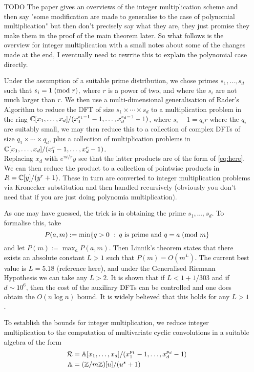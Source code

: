 TODO The paper gives an overviews of the integer multiplication scheme and then say "some modification are made to generalise to the case of polynomial multiplication" but then don't precisely say what they are, they just promise they make them in the proof of the main theorem later. So what follows is the overview for integer multiplication with a small notes about some of the changes made at the end, I eventually need to rewrite this to explain the polynomial case directly.
\medskip

Under the assumption of a suitable prime distribution, we chose primes $s_1, \ldots, s_d$ such that $s_i = 1 \;(\textrm{mod } r)$, where $r$ is a power of two, and where the $s_i$ are not much larger than $r$. We then use a multi-dimensional generalisation of Rader's Algorithm to reduce the DFT of size $s_1 \times \cdots \times s_d$ to a multiplication problem in the ring ${\mathbb C}[x_1, \ldots, x_d] / (x_1^{s_1 - 1} - 1, \ldots, x_d^{s_d - 1} - 1)$, where $s_i - 1 = q_i r$ where the $q_i$ are suitably small, we may then reduce this to a collection of complex DFTs of size $q_1 \times \cdots \times q_d$, plus a collection of multiplication problems in ${\mathbb C}[x_1, \ldots, x_d] / (x_1^r - 1, \ldots, x_d^r - 1)$. \\
Replacing $x_d$ with $e^{\pi i / r}y$ see that the latter products are of the form of \ref{eq:here}.  We can then reduce the product to a collection of pointwise products in $R = {\mathbb C}[y] / (y^r + 1)$. These in turn are converted to integer multiplication problems via Kronecker substitution and then handled recursively (obviously you don't need that if you are just doing polynomia multiplication).

As one may have guessed, the trick is in obtaining the prime $s_1, \ldots, s_d$. To formalise this, take 
\[
    P(a, m) := \min\{q > 0\;:\; q \textrm{ is prime and } q = a \;(\textrm{mod } m\}
\]
and let $P(m) := \max_a P(a, m)$. Then Linnik's theorem states that there exists an absolute constant $L > 1$ such that $P(m) = O(m^L)$. The current best value is $L = 5.18$ (reference here), and under the Generalised Riemann Hypothesis we can take any $L > 2$. It is shown \cite{ffnlogn} that if $L < 1 + 1/303$ and if $d \sim 10^6$, then the cost of the auxiliary DFTs can be controlled and one does obtain the $O(n \log n)$ bound. It is widely believed that this holds for any $L > 1$.

To establish the bounds for integer multiplication, we reduce integer multiplication to the computation of multivariate cyclic convolutions in a suitable algebra of the form
\begin{align*}
    \mathcal R &= \mathbb{A}[x_1, \ldots, x_d] / (x_1^{p_1} - 1, \ldots, x_d^{p_d} - 1)\\
    \mathbb{A} &= ({\mathbb Z} / m{\mathbb Z})[u] / (u^s + 1)
\end{align*}

